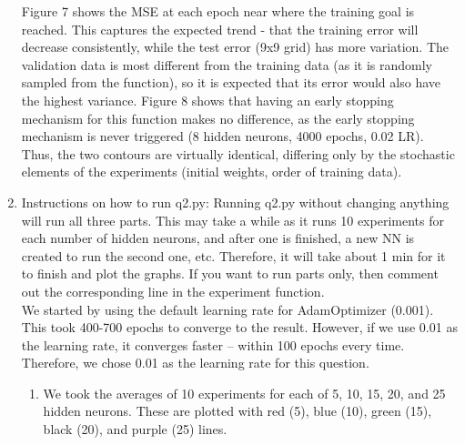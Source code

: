 \documentclass[11pt]{article}
\begin{document}
\begin{enumerate}
Figure 7 shows the MSE at each epoch near where the training goal is reached. This captures the expected trend - that the training error will decrease consistently, while the test error (9x9 grid) has more variation. The validation data is most different from the training data (as it is randomly sampled from the function), so it is expected that its error would also have the highest variance.\newline
\newline
Figure 8 shows that having an early stopping mechanism for this function makes no difference, as the early stopping mechanism is never triggered (8 hidden neurons, 4000 epochs, 0.02 LR). Thus, the two contours are virtually identical, differing only by the stochastic elements of the experiments (initial weights, order of training data). 


\item Instructions on how to run q2.py:\newline
\newline
Running q2.py without changing anything will run all three parts. This may take a while as it runs 10 experiments for each number of hidden neurons, and after one is finished, a new NN is created to run the second one, etc. Therefore, it will take about 1 min for it to finish and plot the graphs. If you want to run parts only, then comment out the corresponding line in the experiment function.\\
We started by using the default learning rate for AdamOptimizer (0.001). This took 400-700 epochs to converge to the result. However, if we use 0.01 as the learning rate, it converges faster -- within 100 epochs every time. Therefore, we chose 0.01 as the learning rate for this question.\\

% 
\begin{enumerate}
\item We took the averages of 10 experiments for each of 5, 10, 15, 20, and 25 hidden neurons. These are plotted with red (5), blue (10), green (15), black (20), and purple (25) lines.\newline


\end{enumerate}
\end{enumerate}
\end{document}
